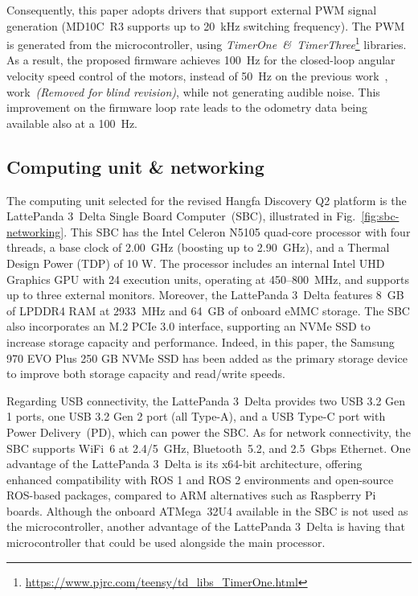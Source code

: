 \documentclass[letterpaper,10pt,conference]{IEEEtran} %
\def\figref#1{Fig.~\ref{#1}}
\def\finalversion{}
\begin{document}
Consequently, this paper adopts drivers that 
support external PWM signal generation
(MD10C~R3 supports up to 20~kHz switching frequency).
The PWM is generated from the microcontroller, using
\textit{TimerOne~\&~TimerThree}\footnote{\label{note:timers-lib}\url{https://www.pjrc.com/teensy/td_libs_TimerOne.html}}
libraries.
As a result, the proposed firmware achieves 
100~Hz for the closed-loop angular velocity speed control of the motors,
instead of 50~Hz on the previous
\ifdefined\finalversion
work~\cite{sousa2024icarsc},
\else
work~\textit{(Removed for blind revision)},
\fi
while not generating audible noise.
This improvement on the firmware loop rate leads to the odometry data
being available also at a 100~Hz.

\subsection{Computing unit \& networking}

The computing unit selected for the revised Hangfa Discovery Q2 platform
is the LattePanda 3~Delta Single Board Computer~(SBC),
illustrated in \figref{fig:sbc-networking}.
This SBC has the Intel Celeron N5105 quad-core processor with four threads,
a base clock of 2.00~GHz (boosting up to 2.90~GHz),
and a Thermal Design Power (TDP) of 10 W.
The processor includes an internal 
Intel UHD Graphics GPU with 24 execution units,
operating at 450--800~MHz, and supports up to three external monitors.
Moreover, the LattePanda 3~Delta features 8~GB of LPDDR4 RAM at 2933~MHz
and 64~GB of onboard eMMC storage.
The SBC also incorporates an M.2 PCIe 3.0 interface,
supporting an NVMe SSD to increase storage capacity and performance.
Indeed, in this paper, the Samsung 970 EVO Plus 250 GB NVMe SSD
has been added as the primary storage device
to improve both storage capacity and read/write speeds.

Regarding USB connectivity,
the LattePanda 3~Delta provides two USB 3.2 Gen 1 ports,
one USB 3.2 Gen 2 port (all Type-A),
and a USB Type-C port with Power Delivery~(PD),
which can power the SBC.
As for network connectivity,
the SBC supports WiFi~6 at 2.4/5~GHz, Bluetooth~5.2, and 2.5~Gbps Ethernet.
One advantage of the LattePanda 3~Delta is its x64-bit architecture,
offering enhanced compatibility with ROS 1 and ROS 2 environments
and open-source ROS-based packages,
compared to ARM alternatives such as Raspberry Pi boards.
Although the onboard ATMega~32U4
available in the SBC is not used as the microcontroller,
another advantage of the LattePanda 3~Delta
is having that microcontroller that could be used alongside the main processor.
\end{document}
